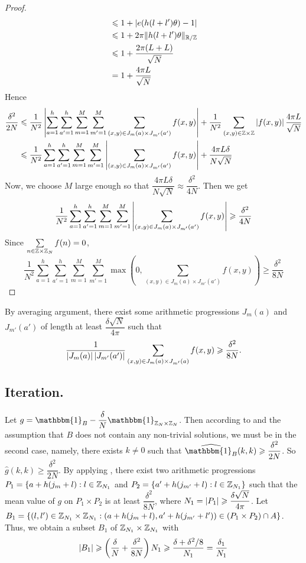 \begin{proof}
\begin{align*}
	& \leqslant 1 + \left\vert{e(h(l+l')\theta) - 1}\right\vert  \\
	& \leqslant 1 + 2\pi  \| h(l+l')\theta \|_{{\mathbb R} /{\mathbb Z}} \\
	& \leqslant 1 + \dfrac{2 \pi  (L+L)} {\sqrt{N}} \\
	& = 1 + \dfrac{4 \pi L}{\sqrt{N}} 
	\end{align*}
	Hence
	\begin{align*}
	\dfrac{\delta^2}{2N} 
	&\leqslant \dfrac{1}{N^2}\left\vert{\sum\limits_{a = 1}^h \sum\limits_{a' = 1} ^h \sum\limits_{m = 1}^M \sum\limits_{m' = 1}^M \sum\limits_{(x,y) \in J_m(a) \times J_{m'}(a')} f(x,y)}\right\vert + \dfrac{1}{N^2} \sum\limits_{(x,y) \in {\mathbb Z} \times {\mathbb Z}} \left\vert{f(x,y)}\right\vert \dfrac{4 \pi L}{\sqrt{N}} \\
	& \leqslant  \dfrac{1}{N^2} \sum\limits_{a = 1}^h \sum\limits_{a' = 1} ^h \sum\limits_{m = 1}^M \sum\limits_{m' = 1}^M \left\vert{\sum\limits_{(x,y) \in J_m(a) \times J_{m'}(a')} f(x,y)}\right\vert + \dfrac{4 \pi L \delta}{N\sqrt{N}}	
	\end{align*}
	Now, we choose $ M $ large enough so that $ \dfrac{4 \pi L \delta}{N\sqrt{N}} \approx \dfrac{\delta^2}{4N} $. Then we get
	$$ \dfrac{1}{N^2}\sum\limits_{a = 1}^h \sum\limits_{a' = 1} ^h \sum\limits_{m = 1}^M \sum\limits_{m' = 1}^M \left\vert{\sum\limits_{(x,y) \in J_m(a) \times J_{m'}(a')} f(x,y)}\right\vert \geqslant \dfrac{\delta^2}{4N} $$
	Since $ \sum\limits_{n \in {\mathbb Z} \times {\mathbb Z}_N} f(n) = 0  $, 
	$$ \dfrac{1}{N^2}\sum\limits_{a = 1}^h \sum\limits_{a' = 1} ^h \sum\limits_{m = 1}^M \sum\limits_{m' = 1}^M \max \left(0, \sum\limits_{(x,y) \in J_m(a) \times J_{m'}(a')} f(x,y) \right) \geq \dfrac{\delta^2}{8N} $$
\end{proof}
	
	\noindent By averaging argument, there exist some arithmetic progressions $ J_m(a) $ and $ J_{m'}(a') $ of length at least $ \dfrac{\delta \sqrt{N}}{4\pi} $ such that 
	$$ \dfrac{1}{\left\vert{J_m(a)}\right\vert \left\vert{J_{m'}(a')}\right\vert} \sum\limits_{(x,y) \in J_m(a) \times J_{m'}(a)} f(x,y) \geqslant \dfrac{\delta^2}{8N} .$$

\subsection{Iteration.}
Let $ g = \mathbbm{1}_B - \dfrac{\delta}{N} \mathbbm{1}_{\bbZ_N \times \bbZ_N} $. Then according to  and the assumption that $ B $ does not contain any non-trivial solutions, we must be in the second case, namely, there exists $ k \neq 0 $ such that $ \widehat{\mathbbm{1}_B}(k,k) \geq \dfrac{\delta^2}{2N} $. So $ \widehat{g}(k, k) \geq \dfrac{\delta^2}{2N} $. By applying , there exist two arithmetic progressions $ P_1  = \{ a + h(j_m + l): l \in {\mathbb Z}_{N_1} $ and $ P_2  = \{ a' + h(j_{m'} + l): l \in  {\mathbb Z}_{N_1} \} $ such that the mean value of $ g $ on $ P_1 \times P_2 $ is at least $ \dfrac{\delta^2}{8N} $, where $ N_1 = \left\vert{P_1}\right\vert \geqslant \dfrac{\delta \sqrt{N}}{4 \pi} $. Let $ B_1 = \{ (l, l') \in {\mathbb Z}_{N_1} \times {\mathbb Z}_{N_1}: (a + h(j_m + l), a' + h(j_{m'} + l')) \in (P_1 \times P_2) \cap A \} $. Thus, we obtain a subset $ B_1 $ of $ {\mathbb Z}_{N_1} \times {\mathbb Z}_{N_1} $ with 
$$ \left\vert{B_1}\right\vert \geqslant \left(\dfrac{\delta}{N} + \dfrac{\delta^2}{8N}\right) N_1 \geqslant \dfrac{\delta + \delta^2/8} {N_1} = \dfrac{\delta_1}{N_1} $$

